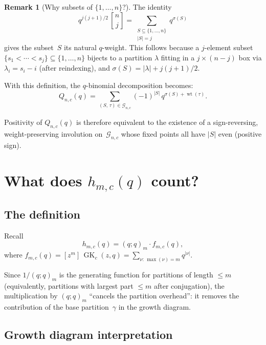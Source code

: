 \documentclass[11pt]{article}
\newcommand{\GK}{\operatorname{GK}}
\newcommand{\qpochn}[3]{(#1;#2)_{#3}}
\newcommand{\qbin}[2]{\genfrac{[}{]}{0pt}{}{#1}{#2}}
\theoremstyle{plain}
\theoremstyle{definition}
\newtheorem{remark}[theorem]{Remark}
\begin{document}
\begin{remark}[Why subsets of $\{1, \ldots, n\}$?]
The identity
\[
  q^{j(j+1)/2}\, \qbin{n}{j}
  = \sum_{\substack{S \subseteq \{1,\ldots,n\} \\ |S| = j}} q^{\sigma(S)}
\]
gives the subset~$S$ its natural $q$-weight.  This follows because
a $j$-element subset $\{s_1 < \cdots < s_j\} \subseteq \{1, \ldots, n\}$
bijects to a partition $\lambda$ fitting in a $j \times (n-j)$ box via
$\lambda_i = s_i - i$ (after reindexing), and
$\sigma(S) = |\lambda| + j(j+1)/2$.
\end{remark}

With this definition, the $q$-binomial decomposition becomes:
\begin{equation}\label{eq:Q-ground-set}
  Q_{n,c}(q)
  = \sum_{(S,\,\tau) \in \mathcal{G}_{n,c}}
    (-1)^{|S|}\, q^{\sigma(S) + \operatorname{wt}(\tau)}.
\end{equation}

Positivity of $Q_{n,c}(q)$ is therefore equivalent to the existence
of a sign-reversing, weight-preserving involution on~$\mathcal{G}_{n,c}$
whose fixed points all have $|S|$ even (positive sign).


\section{What does $h_{m,c}(q)$ count?}
\label{sec:hmc}

\subsection{The definition}

Recall
\[
  h_{m,c}(q) = \qpochn{q}{q}{m} \cdot f_{m,c}(q),
\]
where $f_{m,c}(q) = [z^m]\,\GK_c(z,q) = \sum_{\nu:\,\max(\nu)=m} q^{|\nu|}$.

Since $1/\qpochn{q}{q}{m}$ is the generating function for partitions
of length $\leq m$ (equivalently, partitions with largest part $\leq m$
after conjugation), the multiplication by $\qpochn{q}{q}{m}$ ``cancels
the partition overhead'': it removes the contribution of the base
partition~$\gamma$ in the growth diagram.

\subsection{Growth diagram interpretation}
\end{document}
